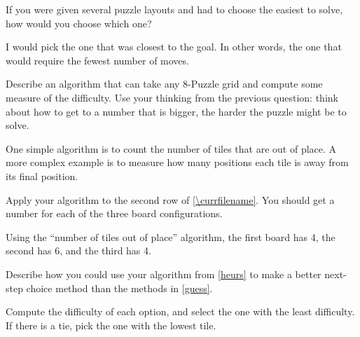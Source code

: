 \Q If you were given several puzzle layouts and had to choose the easiest to solve, how would you choose which one?

\begin{answer}
I would pick the one that was closest to the goal.
In other words, the one that would require the fewest number of moves.
\end{answer}


\Q \label{heurs} Describe an algorithm that can take any 8-Puzzle grid and compute some measure of the difficulty.
Use your thinking from the previous question: think about how to get to a number that is bigger, the harder the puzzle might be to solve.

\begin{answer}
One simple algorithm is to count the number of tiles that are out of place.
A more complex example is to measure how many positions each tile is away from its final position.
\end{answer}


\Q Apply your algorithm to the second row of \ref{\currfilename}. You should get a number for each of the three board configurations.

\begin{answer}
Using the ``number of tiles out of place'' algorithm, the first board has 4, the second has 6, and the third has 4.
\end{answer}


\Q Describe how you could use your algorithm from \ref{heurs} to make a better next-step choice method than the methods in \ref{guess}.

\begin{answer}
Compute the difficulty of each option, and select the one with the least difficulty.
If there is a tie, pick the one with the lowest tile.
\end{answer}
